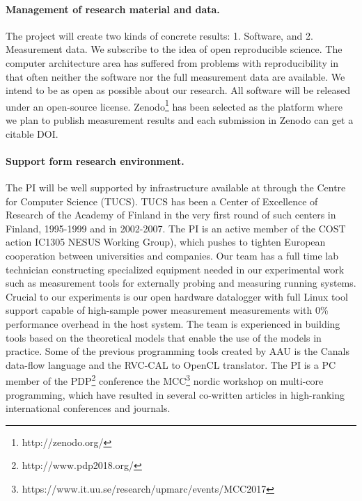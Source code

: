 \documentclass{article}
\begin{document}
\paragraph{Management of research material and data. }
The project will create two kinds of concrete results: 1. Software, and 2. Measurement data. 
We subscribe to the idea of open reproducible science. 
The computer architecture area has suffered from problems with reproducibility in that often neither the software nor the full measurement data are available. 
We intend to be as open as possible about our research. 
All software will be released under an open-source license. 
Zenodo\footnote{http://zenodo.org/} has been selected as the platform where we plan to publish measurement results and each submission in Zenodo can get a citable DOI.

\paragraph{Support form research environment. }
The PI will be well supported by infrastructure available at through the Centre for Computer Science (TUCS).
TUCS has been a Center of Excellence of Research of the Academy of Finland in the very first round of such centers in Finland, 1995-1999 and in 2002-2007. 
The PI is an active member of the COST action IC1305 NESUS Working Group), which pushes to tighten European cooperation between universities and companies.
Our team has a full time lab technician constructing specialized equipment needed in our experimental work such as measurement tools for externally probing and measuring running systems. 
Crucial to our experiments is our open hardware datalogger with full Linux tool support capable of high-sample power measurement measurements with 0\% performance overhead in the host system. 
The team is experienced in building tools based on the theoretical models that enable the use of the models in practice. 
Some of the previous programming tools created by AAU is the Canals data-flow language and the RVC-CAL to OpenCL translator. 
The PI is a PC member of the PDP\footnote{http://www.pdp2018.org/} conference the MCC\footnote{https://www.it.uu.se/research/upmarc/events/MCC2017} nordic workshop on multi-core programming, which have resulted in several co-written articles in high-ranking international conferences and journals.
\end{document}
